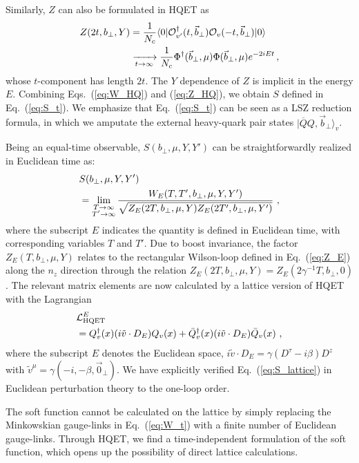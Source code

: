 Similarly, $Z$ can also be formulated in HQET as
\begin{align}\label{eq:Z_HQ}
	Z(2t,b_\perp,Y)&=\frac{1}{N_c}\langle0|{\cal O}^\dagger_{v'}(t,{\vec b}_\perp){\cal O}_v(-t,\vec{b}_\perp)|0\rangle \nonumber\\
	&\xrightarrow[\substack{t\to\infty}]{}\frac{1}{N_c}\Phi^\dagger({\vec b}_\perp,\mu)\Phi({\vec b}_\perp,\mu)e^{-2iEt}\,,
\end{align}
whose $t$-component has length $2t$.
%
The $Y$ dependence of $Z$ is implicit in the energy $E$.
%
Combining Eqs.~(\ref{eq:W_HQ}) and (\ref{eq:Z_HQ}), we obtain $S$ defined in Eq.~(\ref{eq:S_t}). We emphasize that Eq.~(\ref{eq:S_t}) can be seen as a LSZ reduction formula, in which we amputate the external heavy-quark pair states $|\overline QQ,{\vec b}_\perp\rangle_v$.

Being an equal-time observable, $S(b_\perp,\mu,Y,Y')$ can be straightforwardly realized in Euclidean time as:
\begin{align}\label{eq:S_lattice}
	&S(b_\perp,\mu,Y,Y') \\
	&=\lim_{\substack{T\to\infty\\T'\to\infty}}\frac{W_E(T,T',b_\perp,\mu,Y,Y')}{\sqrt{Z_E(2T,b_\perp,\mu,Y)Z_E(2T',b_\perp,\mu,Y')}}  \ , \nn
\end{align}
where the subscript $E$ indicates the quantity is defined in Euclidean time, with corresponding
variables $T$ and $T'$. Due to boost invariance, the factor $Z_E(T,b_\perp,\mu,Y)$ relates to the rectangular Wilson-loop defined in Eq.~(\ref{eq:Z_E}) along the $n_z$ direction through the relation $Z_E(2T,b_\perp,\mu,Y)=Z_E(2\gamma^{-1}T,b_\perp,0)$.
%
The relevant matrix elements are now calculated by a lattice version of HQET with the Lagrangian~\cite{Aglietti:1993hf,Hashimoto:1995in,Horgan:2009ti}
\begin{align}\label{eq:L_HQ}
	&{\cal L}_{{\rm HQET}}^E  \\
	&=Q_v^\dagger(x) (i\tilde v\cdot D_E)Q_v(x)+\bar Q_v^\dagger(x) (i\tilde v\cdot D_E)\bar Q_v(x) \ , \nonumber
\end{align}
where the subscript $E$ denotes the Euclidean space, $i\tilde v\cdot D_E=\gamma(D^\tau-i\beta )D^z$ with $\tilde v^\mu=\gamma(-i,-\beta,\vec 0_\perp)$. We have explicitly verified Eq.~(\ref{eq:S_lattice}) in Euclidean perturbation theory to the one-loop order.

The soft function cannot be calculated on the lattice by simply replacing the Minkowskian gauge-links in Eq.~(\ref{eq:W_t}) with a finite number of Euclidean gauge-links. Through HQET, we find a time-independent formulation of the soft function, which opens up the possibility of direct lattice calculations.

